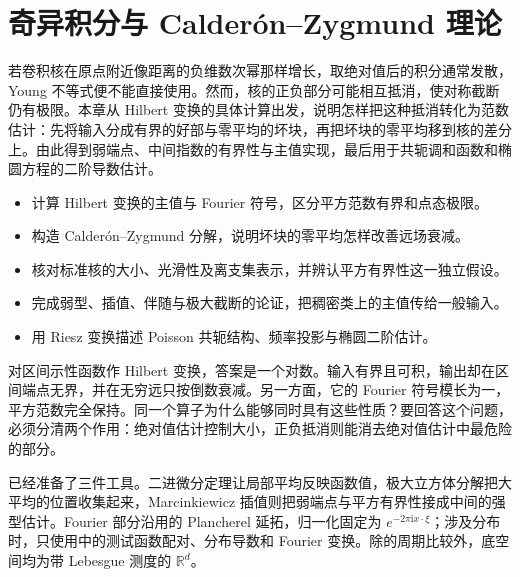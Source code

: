 \chapter{奇异积分与 Calderón–Zygmund 理论}
\label{b2:ch:18}
\begin{chapterabstract}
若卷积核在原点附近像距离的负维数次幂那样增长，取绝对值后的积分通常发散，Young 不等式便不能直接使用。然而，核的正负部分可能相互抵消，使对称截断仍有极限。本章从 Hilbert 变换的具体计算出发，说明怎样把这种抵消转化为范数估计：先将输入分成有界的好部与零平均的坏块，再把坏块的零平均移到核的差分上。由此得到弱端点、中间指数的有界性与主值实现，最后用于共轭调和函数和椭圆方程的二阶导数估计。
\end{chapterabstract}

\begin{learninggoals}\begin{itemize}
\item\label{b2:item:18-goal-1}计算 Hilbert 变换的主值与 Fourier 符号，区分平方范数有界和点态极限。
\item\label{b2:item:18-goal-2}构造 Calderón--Zygmund 分解，说明坏块的零平均怎样改善远场衰减。
\item\label{b2:item:18-goal-3}核对标准核的大小、光滑性及离支集表示，并辨认平方有界性这一独立假设。
\item\label{b2:item:18-goal-4}完成弱型、插值、伴随与极大截断的论证，把稠密类上的主值传给一般输入。
\item\label{b2:item:18-goal-5}用 Riesz 变换描述 Poisson 共轭结构、频率投影与椭圆二阶估计。
\end{itemize}\end{learninggoals}

对区间示性函数作 Hilbert 变换，答案是一个对数。输入有界且可积，输出却在区间端点无界，并在无穷远只按倒数衰减。另一方面，它的 Fourier 符号模长为一，平方范数完全保持。同一个算子为什么能够同时具有这些性质？要回答这个问题，必须分清两个作用：绝对值估计控制大小，正负抵消则能消去绝对值估计中最危险的部分。

\ProseParagraphBreak

已经准备了三件工具。二进微分定理让局部平均反映函数值，极大立方体分解把大平均的位置收集起来，Marcinkiewicz 插值则把弱端点与平方有界性接成中间的强型估计。Fourier 部分沿用的 Plancherel 延拓，归一化固定为 \(e^{-2\pi\mathrm i x\cdot\xi}\)；涉及分布时，只使用中的测试函数配对、分布导数和 Fourier 变换。除的周期比较外，底空间均为带 Lebesgue 测度的 \(\mathbb R^d\)。


